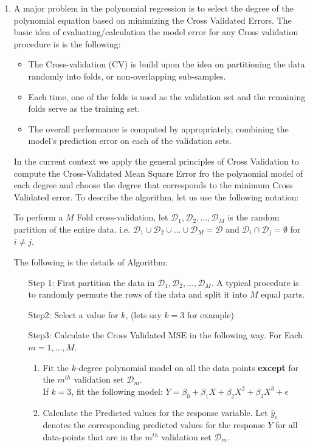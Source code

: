 \documentclass[12pt]{article}
\begin{document}
\begin{enumerate}
\begin{enumerate}
\vspace{.5in}
\item A major problem in the polynomial regression is to select the degree of the polynomial equation based on minimizing the Cross Validated Errors.   The basic idea of evaluating/calculation  the model error for any Cross validation procedure is is the following: 

\begin{itemize}
\item 
The Cross-validation (CV)  is build upon the idea on  partitioning the data randomly into folds, or non-overlapping sub-samples.
\item Each time, one of the folds is used as the validation set and the remaining  folds serve as the training set.
\item The overall performance is computed by appropriately, combining the model's prediction error on each of the  validation sets.
\end{itemize}

In the current context we apply the general principles of Cross Validation to compute the Cross-Validated Mean Square Error fro the polynomial model of each degree and choose the degree that corresponds to  the minimum Cross Validated error. To describe the algorithm, let us use the following notation:

To perform a $M$ Fold cross-validation, let  $\mathcal{D}_1, \mathcal{D}_2, \ldots,  \mathcal{D}_M$ is the random partition of the entire data. i.e.  
$\mathcal{D}_1\cup \mathcal{D}_2\cup \ldots\cup \mathcal{D}_M= \mathcal{D}$ and $\mathcal{D}_i\cap \mathcal{D}_j =\emptyset$ for $i\neq j$.


The following is the details of Algorithm: 

\begin{enumerate}
\item[Step 1:] First partition the data in  $\mathcal{D}_1, \mathcal{D}_2, \ldots,  \mathcal{D}_M$. A typical procedure is to randomly permute the rows of the data and split it into $M$ equal parts. 
\item[Step2: ]  Select a value for $k$, (lets say $k=3$ for example) 
\item[Step3: ] Calculate the Cross Validated MSE in the following way.  For Each $m=1, \ldots , M$. 
\begin{enumerate}
\item Fit the $k$-degree polynomial model on all the data points {\bf except} for the $m^{th}$ validation set $\mathcal{D}_{m}$.  \\
If $k=3$, fit the following model: 
$Y= \beta_0+\beta_1X+\beta_2X^2+\beta_3X^3+\epsilon$
\item Calculate the Predicted values for the response variable.  Let $\widehat{y}_i$ denotes the corresponding predicted values for the response $Y$ for all data-points that are in the $m^{th}$ validation set $\mathcal{D}_m$.


\end{enumerate}
\end{enumerate}
\end{enumerate}
\end{enumerate}
\end{document}
